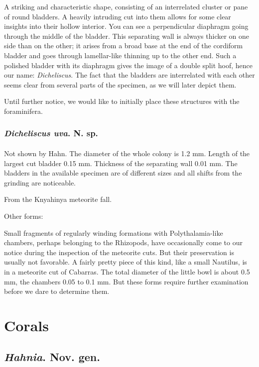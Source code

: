\documentclass[a4paper, 12pt, oneside]{article}
\begin{document}
A striking and characteristic shape, consisting of an interrelated cluster or pane of round bladders. A heavily intruding cut into them allows for some clear insights into their hollow interior. You can see a perpendicular diaphragm going through the middle of the bladder. This separating wall is always thicker on one side than on the other; it arises from a broad base at the end of the cordiform bladder and goes through lamellar-like thinning up to the other end. Such a polished bladder with its diaphragm gives the image of a double split hoof, hence our name: \emph{Dicheliscus}. The fact that the bladders are interrelated with each other seems clear from several parts of the specimen, as we will later depict them.

Until further notice, we would like to initially place these structures with the foraminifera.
\subsubsection{\emph{Dicheliscus uva}. N. sp.}
\paragraph{}
Not shown by Hahn. The diameter of the whole colony is 1.2 mm. Length of the largest cut bladder 0.15 mm. Thickness of the separating wall 0.01 mm. The bladders in the available specimen are of different sizes and all shifts from the grinding are noticeable.

From the Knyahinya meteorite fall.

Other forms:

Small fragments of regularly winding formations with Polythalamia-like chambers, perhaps belonging to the Rhizopods, have occasionally come to our notice during the inspection of the meteorite cuts. But their preservation is usually not favorable. A fairly pretty piece of this kind, like a small Nautilus, is in a meteorite cut of Cabarras. The total diameter of the little bowl is about 0.5 mm, the chambers 0.05 to 0.1 mm. But these forms require further examination before we dare to determine them.
\clearpage
\section{Corals}
\subsection{\emph{Hahnia}. Nov. gen.}
\end{document}
